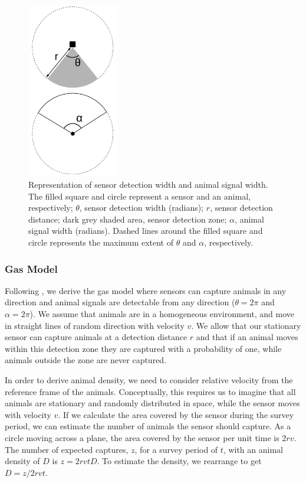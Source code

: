 \documentclass[a4paper,10pt,reqno,oneside]{amsart}
\begin{document}
\begin{figure}[t]
        \centering
	\includegraphics[width=4cm]{imgs/angleDefinitions.pdf}

\caption{Representation of sensor detection width and animal signal width. The filled square and circle represent a sensor and an animal, respectively; $\theta$, sensor detection width (radians); $r$, sensor detection distance; dark grey shaded area, sensor detection zone; $\alpha$, animal signal width (radians). Dashed lines around the filled square and circle represents the maximum extent of $\theta$ and $\alpha$, respectively.} 
\label{f:AngleDef}
\end{figure}



\subsubsection*{Gas Model}

Following \cite{yapp1956theory}, we derive the gas model where sensors can capture animals in any direction and animal signals are detectable from any direction ($ \theta =  2\pi$ and $ \alpha =  2\pi$). We assume that animals are in a homogeneous environment, and move in straight lines of random direction with velocity $v$. We allow that our stationary sensor can capture animals at a detection distance $r$ and that if an animal moves within this detection zone they are captured with a probability of one, while animals outside the zone are never captured.

In order to derive animal density, we need to consider relative velocity from the reference frame of the animals. Conceptually, this requires us to imagine that all animals are stationary and randomly distributed in space, while the sensor moves with velocity $v$. If we calculate the area covered by the sensor during the survey period, we can estimate the number of animals the sensor should capture. As a circle moving across a plane, the area covered by the sensor per unit time is $2rv$. The number of expected captures, $z$, for a survey period of $t$, with an animal density of $D$ is $z = 2rvtD$. To estimate the density, we rearrange to get $D = z/2rvt$.
\end{document}
